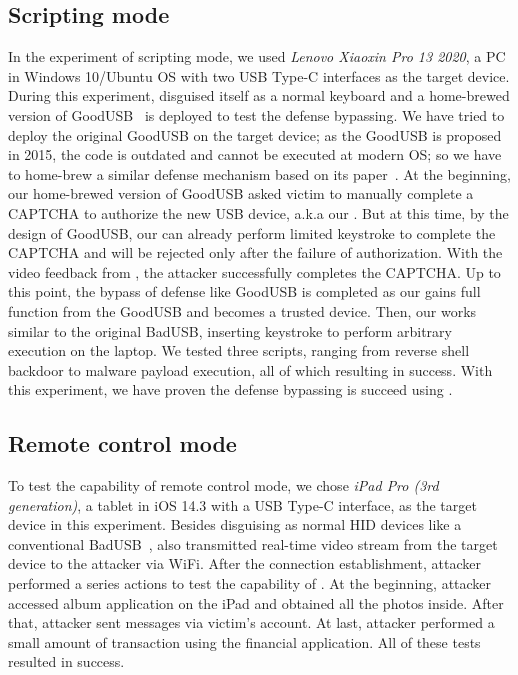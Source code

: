 \subsection{Scripting mode}

In the experiment of scripting mode, we used \textit{Lenovo Xiaoxin Pro 13
2020}, a PC in Windows 10/Ubuntu OS with two USB Type-C interfaces as the
target device.  During this experiment, \tool disguised itself as a normal
keyboard and a home-brewed version of GoodUSB~\cite{tian2015defending} is
deployed to test the defense bypassing. We have tried to deploy the original
GoodUSB on the target device; as the GoodUSB is proposed in 2015, the code is
outdated and cannot be executed at modern OS; so we have to home-brew a similar
defense mechanism based on its paper~\cite{tian2015defending}.  At the
beginning, our home-brewed version of GoodUSB asked victim to manually complete
a CAPTCHA to  authorize the new USB device, a.k.a our \tool. But at this time,
by the design of GoodUSB,  our \tool can already perform limited keystroke to complete the
CAPTCHA and will be rejected only after the failure of authorization. With the
video feedback from \tool, the attacker successfully completes the CAPTCHA.  Up
to this point, the bypass of defense like GoodUSB is completed as our \tool
gains full function from the GoodUSB and becomes a trusted device. Then, our
\tool works similar to the original BadUSB, inserting keystroke to perform
arbitrary execution on the laptop. We tested three scripts, ranging from
reverse shell backdoor to malware payload execution, all of which resulting in
success.  With this experiment, we have proven the defense bypassing is succeed
using \tool.

\subsection{Remote control mode}

To test the capability of remote control mode, we chose \textit{iPad Pro (3rd
generation)}, a tablet in iOS 14.3 with a USB Type-C interface, as the target
device in this experiment.  Besides disguising as normal HID devices like a
conventional BadUSB~\cite{badusb}, \tool also transmitted real-time video
stream from the target device to the attacker via WiFi.  After the connection
establishment, attacker performed a series actions to test the capability of
\tool. At the beginning, attacker accessed album application on the iPad and
obtained all the photos inside. After that, attacker sent messages via victim's
account. At last, attacker performed a small amount of transaction using the
financial application. All of these tests resulted in success.

